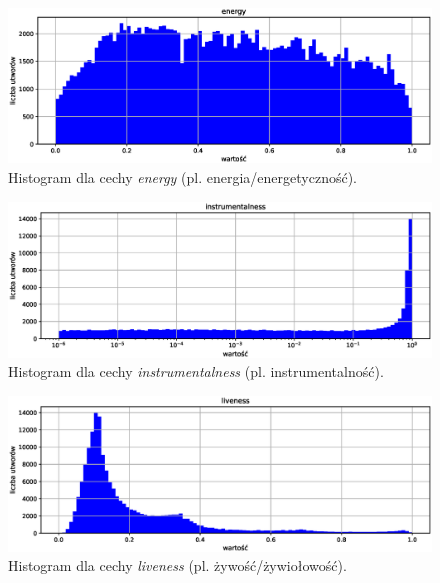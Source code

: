 \documentclass[a4paper,11pt]{article}
\begin{document}
    \smallskip

    \begin{figure}[H]
        \label{fig:energy}
        \centering
        \includegraphics[width=\textwidth]{energy}
        \caption{Histogram dla cechy \textit{energy} (pl. energia/energetyczność).}
    \end{figure}

    \smallskip

    \begin{figure}[H]
        \label{fig:instrumentalness}
        \centering
        \includegraphics[width=\textwidth]{instrumentalness}
        \caption{Histogram dla cechy \textit{instrumentalness} (pl. instrumentalność).}
    \end{figure}

    \smallskip

    \begin{figure}[H]
        \label{fig:liveness}
        \centering
        \includegraphics[width=\textwidth]{liveness}
        \caption{Histogram dla cechy \textit{liveness} (pl. żywość/żywiołowość).}
    \end{figure}
\end{document}

